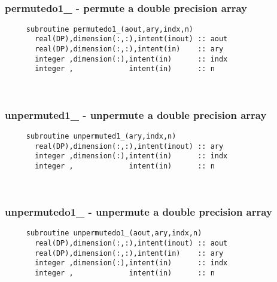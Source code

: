  
\mbox{}\hrulefill\ 
 

  \subsubsection{permutedo1\_ - permute a double precision array}

\begin{verbatim} 
     subroutine permutedo1_(aout,ary,indx,n)
       real(DP),dimension(:,:),intent(inout) :: aout
       real(DP),dimension(:,:),intent(in)    :: ary
       integer ,dimension(:),intent(in)      :: indx
       integer ,             intent(in)      :: n
 \end{verbatim}%
 
 
\mbox{}\hrulefill\ 
 

  \subsubsection{unpermuted1\_ - unpermute a double precision array}

\begin{verbatim} 
     subroutine unpermuted1_(ary,indx,n)
       real(DP),dimension(:,:),intent(inout) :: ary
       integer ,dimension(:),intent(in)      :: indx
       integer ,             intent(in)      :: n
 \end{verbatim}%
 
 
\mbox{}\hrulefill\ 
 

  \subsubsection{unpermutedo1\_ - unpermute a double precision array}

\begin{verbatim} 
     subroutine unpermutedo1_(aout,ary,indx,n)
       real(DP),dimension(:,:),intent(inout) :: aout
       real(DP),dimension(:,:),intent(in)    :: ary
       integer ,dimension(:),intent(in)      :: indx
       integer ,             intent(in)      :: n
 \end{verbatim}%
 
